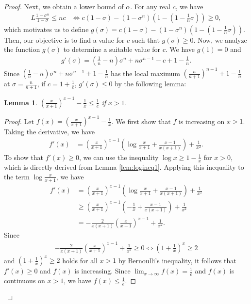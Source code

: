 \documentclass{article}
\theoremstyle{plain}
\newtheorem{lemma}[theorem]{Lemma}
\theoremstyle{definition}
\theoremstyle{remark}
\def\bigopen#1{\left(#1\right)}
\begin{document}
\begin{proof}
Next, we obtain a lower bound of $\alpha$. For any real $c$, we have  
\begin{align*}
    L \frac{1-\sigma^n}{1-\sigma} \le nc &\iff c(1-\sigma)-(1-\sigma^n)\bigopen{ 1-\bigopen{1-\frac{1}{n}\sigma} }  \ge 0,
\end{align*}
which motivates us to define $g(\sigma) = c(1-\sigma)-(1-\sigma^n)\bigopen{ 1-\bigopen{1-\frac{1}{n}\sigma} } $. Then, our objective is to find a value for $c$ such that $g(\sigma) \ge 0$. 
Now, we analyze the function $g(\sigma)$ to determine a suitable value for $c$. We have $g(1)=0$ and 
\begin{align*}
   g'(\sigma) = \bigopen{ \frac{1}{n}-n }\sigma^n+n\sigma^{n-1}-c+1-\frac{1}{n}.
\end{align*}
Since $\bigopen{ \frac{1}{n}-n }\sigma^n+n\sigma^{n-1}+1-\frac{1}{n}$ has the local maximum $\bigopen{ \frac{n}{n+1} }^{n-1} + 1 -\frac{1}{n}$ at $\sigma=\frac{n}{n+1}$, if $c=1+\frac{1}{e}$, $g'(\sigma)\le 0$ by the following lemma:
\begin{lemma}
$\bigopen{ \frac{x}{x+1} }^{x-1}-\frac{1}{x}\le \frac{1}{e}$ if $x > 1$.
\end{lemma}
\begin{proof}
Let $f(x)=\bigopen{ \frac{x}{x+1} }^{x-1}-\frac{1}{x}$. We first show that $f$ is increasing on $x>1$. Taking the derivative, we have 
\begin{align*}
    f'(x) &= \bigopen{ \frac{x}{x+1} }^{x-1} \bigopen{ \log \frac{x}{x+1} +\frac{x-1}{x(x+1)}} + \frac{1}{x^2}.
\end{align*}
To show that $f'(x)\ge 0$, we can use the inequality $\log x \ge 1-\frac{1}{x}$ for $x>0$, which is directly derived from Lemma \ref{lem:logineq1}. Applying this inequality to the term $\log \frac{x}{x+1}$, we have \begin{align*}
f'(x) &= \bigopen{ \frac{x}{x+1} }^{x-1} \bigopen{ \log \frac{x}{x+1} +\frac{x-1}{x(x+1)}} + \frac{1}{x^2}\\
&\ge \bigopen{ \frac{x}{x+1} }^{x-1} \bigopen{ -\frac{1}{x} +\frac{x-1}{x(x+1)}} + \frac{1}{x^2}\\
& = -\frac{2}{x(x+1)} \bigopen{ \frac{x}{x+1} }^{x-1} + \frac{1}{x^2}.
\end{align*}
Since 
\begin{align*}
-\frac{2}{x(x+1)} \bigopen{ \frac{x}{x+1} }^{x-1} + \frac{1}{x^2} \ge 0 \iff \bigopen{ 1+\frac{1}{x} }^x \ge 2
\end{align*} and $\bigopen{ 1+\frac{1}{x} }^x \ge 2$ holds for all $x>1$ by Bernoulli's inequality, it follows that $f'(x)\ge 0$ and $f(x)$ is increasing. Since $\lim_{x\to \infty} f(x) = \frac{1}{e}$ and $f(x)$ is continuous on $x>1$, we have $f(x) \le \frac{1}{e}$.
\end{proof}


\end{proof}
\end{document}
